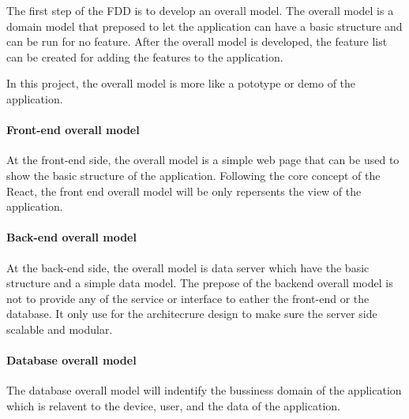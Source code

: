 The first step of the FDD is to develop an overall model. The overall model is a domain model that preposed to let the application
can have a basic structure and can be run for no feature.
After the overall model is developed, the feature list can be created for adding the features to the application.

In this project, the overall model is more like a pototype or demo of the application.

\paragraph{Front-end overall model}
At the front-end side, the overall model is a simple web page that can be used to show the basic structure of the application.
Following the core concept of the React, the front end overall model will be only repersents the view of the application.

\paragraph{Back-end overall model}
At the back-end side, the overall model is data server which have the basic structure and a simple data model.
The prepose of the backend overall model is not to provide any of the service or interface to eather the front-end or the database.
It only use for the architecrure design to make sure the server side scalable and modular.

\paragraph{Database overall model}
The database overall model will indentify the bussiness domain of the application 
which is relavent to the device, user, and the data of the application.